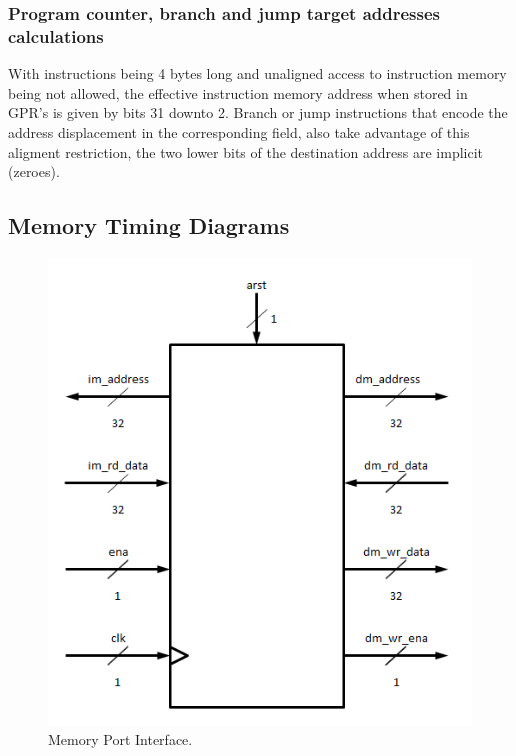 \subsubsection{Program counter, branch and jump target addresses calculations}
\label{sssec:pc_branch_jump}
With instructions being 4 bytes long and unaligned access to instruction memory being not allowed, the effective instruction memory
address when stored in GPR's is given by bits 31 downto 2.
Branch or jump instructions that encode the address displacement in the corresponding field, also take advantage of this aligment
restriction, the two lower bits of the destination address are implicit (zeroes).

\subsection{Memory Timing Diagrams}
\label{ssec:memory_timing_diagrams}
\begin{figure}
\begin{center}
\includegraphics[scale=0.6]{./figures/interface.png}
\end{center}
\caption{Memory Port Interface.}
\label{fig:mem_port}
\end{figure}


